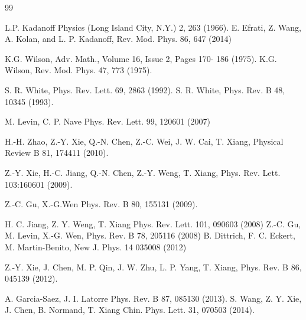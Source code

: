 \documentclass[aps,prl,twocolumn,showpacs,superscriptaddress,floatfix,10pt]{revtex4-1}
\begin{document}
\begin{thebibliography}{99}


L.P. Kadanoff 
Physics (Long Island City, N.Y.) 2, 263 (1966). 
%
E. Efrati, Z. Wang, A. Kolan, and L. P. Kadanoff,
Rev. Mod. Phys. 86, 647 (2014) %

K.G. Wilson, Adv. Math., Volume 16, Issue 2, Pages 170-
186 (1975). 
K.G. Wilson, Rev. Mod. Phys. 47, 773 (1975).

S. R. White, Phys. Rev. Lett. 69, 2863 (1992).
S. R. White, Phys. Rev. B 48, 10345 (1993).

M. Levin, C. P. Nave
Phys. Rev. Lett. 99, 120601 (2007)

H.-H. Zhao, Z.-Y. Xie, Q.-N. Chen, Z.-C. Wei, J. W. Cai, T. Xiang,	
Physical Review B 81, 174411 (2010).

 Z.-Y. Xie, H.-C. Jiang, Q.-N. Chen, Z.-Y. Weng, T. Xiang,	
Phys. Rev. Lett. 103:160601 (2009).

Z.-C. Gu, X.-G.Wen
Phys. Rev. B 80, 155131 (2009).


H. C. Jiang, Z. Y. Weng, T. Xiang
Phys. Rev. Lett. 101, 090603 (2008)
%
Z.-C. Gu, M. Levin, X.-G. Wen, 	
Phys. Rev. B 78, 205116 (2008)
%
B. Dittrich, F. C. Eckert, M. Martin-Benito, 	
New J. Phys. 14 035008 (2012)


Z.-Y. Xie, J. Chen, M. P. Qin, J. W.  Zhu, L. P. Yang, T. Xiang,	
Phys. Rev. B 86, 045139 (2012).

A. Garcia-Saez, J. I. Latorre
Phys. Rev. B 87, 085130 (2013).
%
S. Wang, Z. Y. Xie, J. Chen, B. Normand, T. Xiang
Chin. Phys. Lett. 31, 070503 (2014).


\end{thebibliography}
\end{document}
